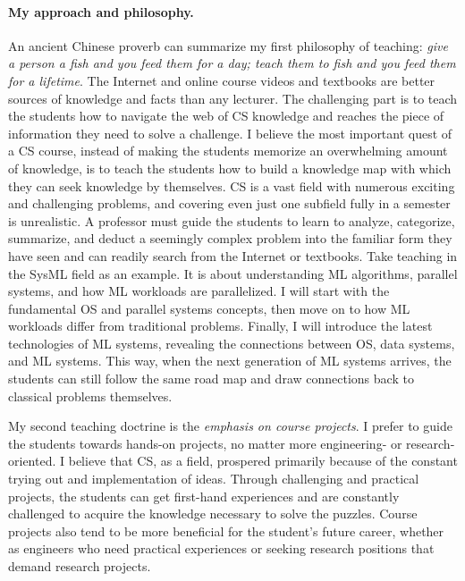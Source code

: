 \documentclass[letterpaper]{article}
\begin{document}
\paragraph{My approach and philosophy.} An ancient Chinese proverb can summarize my first philosophy of teaching: \textit{give a person a fish and you feed them for a day; teach them to fish and you feed them for a lifetime}. The Internet and online course videos and textbooks are better sources of knowledge and facts than any lecturer. The challenging part is to teach the students how to navigate the web of CS knowledge and reaches the piece of information they need to solve a challenge. I believe the most important quest of a CS course, instead of making the students memorize an overwhelming amount of knowledge, is to teach the students how to build a knowledge map with which they can seek knowledge by themselves. CS is a vast field with numerous exciting and challenging problems, and covering even just one subfield fully in a semester is unrealistic. A professor must guide the students to learn to analyze, categorize, summarize, and deduct a seemingly complex problem into the familiar form they have seen and can readily search from the Internet or textbooks. Take teaching in the SysML field as an example. It is about understanding ML algorithms, parallel systems, and how ML workloads are parallelized. I will start with the fundamental OS and parallel systems concepts, then move on to how ML workloads differ from traditional problems. Finally, I will introduce the latest technologies of ML systems, revealing the connections between OS, data systems, and ML systems. This way, when the next generation of ML systems arrives, the students can still follow the same road map and draw connections back to classical problems themselves. 

My second teaching doctrine is the \textit{emphasis on course projects}. I prefer to guide the students towards hands-on projects, no matter more engineering- or research-oriented. I believe that CS, as a field, prospered primarily because of the constant trying out and implementation of ideas. Through challenging and practical projects, the students can get first-hand experiences and are constantly challenged to acquire the knowledge necessary to solve the puzzles. Course projects also tend to be more beneficial for the student's future career, whether as engineers who need practical experiences or seeking research positions that demand research projects.
\end{document}
